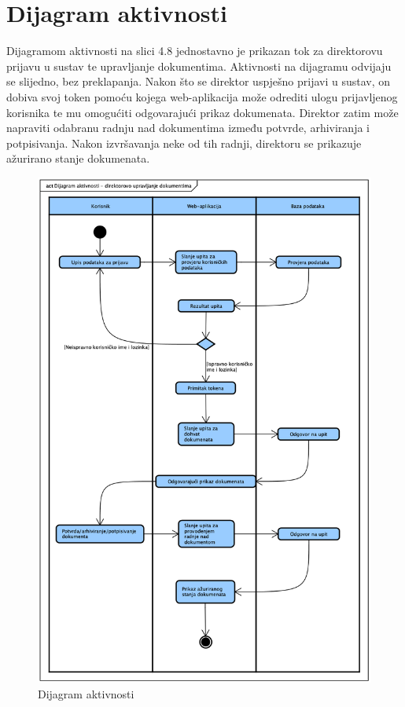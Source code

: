		\section{Dijagram aktivnosti}
			Dijagramom aktivnosti na slici 4.8 jednostavno je prikazan tok za direktorovu prijavu u sustav te upravljanje dokumentima. Aktivnosti na dijagramu
			odvijaju se slijedno, bez preklapanja. Nakon što se direktor uspješno prijavi u sustav, on dobiva svoj token pomoću kojega web-aplikacija može odrediti
			ulogu prijavljenog korisnika te mu omogućiti odgovarajući prikaz dokumenata. Direktor zatim može napraviti odabranu radnju nad dokumentima između potvrde,
			arhiviranja i potpisivanja. Nakon izvršavanja neke od tih radnji, direktoru se prikazuje ažurirano stanje dokumenata.
			\newline
			\begin{figure}[H]
				\centering
				\includegraphics[scale=0.5]{slike/Activity.png}
				\caption{Dijagram aktivnosti}
				\label{fig:Activity}
			\end{figure}
			
